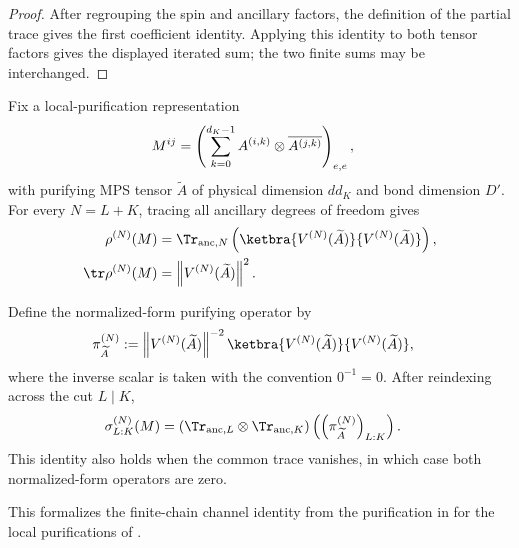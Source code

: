 \begin{proof}\leanok
    After regrouping the spin and ancillary factors, the definition of the
    partial trace gives the first coefficient identity. Applying this identity
    to both tensor factors gives the displayed iterated sum; the two finite
    sums may be interchanged.
\end{proof}

\begin{lemma}
    \label{thm:lpdo_block_channel_image}
    \leanok
    Fix a local-purification representation
    \begin{align}
        M^{ij}
         & =\left(\sum_{k=0}^{d_K-1}
        A^{(i,k)}\otimes\overline{A^{(j,k)}}\right)_{e,e},
        \notag
    \end{align}
    with purifying MPS tensor $\widetilde A$ of physical dimension $d d_K$
    and bond dimension $D'$. For every $N=L+K$, tracing all ancillary
    degrees of freedom gives
    \begin{align}
        \rho^{(N)}(M)
         & =\Tr_{\mathrm{anc},N}
        \left(\ketbra{V^{(N)}(\widetilde A)}
        {V^{(N)}(\widetilde A)}\right), \notag               \\
        \tr\rho^{(N)}(M)
         & =\left\lVert V^{(N)}(\widetilde A)\right\rVert^2.
        \notag
    \end{align}

    Define the normalized-form purifying operator by
    \begin{align}
        \pi_{\widetilde A}^{(N)}
         & :=\left\lVert V^{(N)}(\widetilde A)\right\rVert^{-2}
        \ketbra{V^{(N)}(\widetilde A)}
        {V^{(N)}(\widetilde A)},
        \notag
    \end{align}
    where the inverse scalar is taken with the convention $0^{-1}=0$. After
    reindexing across the cut $L\mid K$,
    \begin{align}
        \sigma^{(N)}_{L:K}(M)
         & =\left(\Tr_{\mathrm{anc},L}\otimes
        \Tr_{\mathrm{anc},K}\right)
        \left(\left(\pi_{\widetilde A}^{(N)}\right)_{L:K}\right).
        \notag
    \end{align}
    This identity also holds when the common trace vanishes, in which case both
    normalized-form operators are zero.

    This formalizes the finite-chain channel identity from the purification in
    \cite[equation~(4)]{Wolf2008AreaLaws} for the local purifications of
    \cite[Section~4.3]{Cirac2016MPDO_arXiv}.
\end{lemma}

